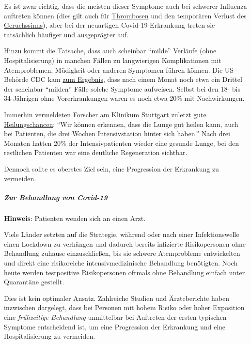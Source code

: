Es ist zwar richtig, dass die meisten dieser Symptome auch bei schwerer
Influenza auftreten können (dies gilt auch für
\href{https://www.sciencedaily.com/releases/2009/10/091014111549.htm}{Thrombosen}
und den temporären Verlust des
\href{https://pubmed.ncbi.nlm.nih.gov/23948436/}{Geruchssinns}), aber
bei der neuartigen Covid-19-Erkrankung treten sie tatsächlich häufiger
und ausgeprägter auf.

Hinzu kommt die Tatsache, dass auch scheinbar ``milde'' Verläufe (ohne
Hospitalisierung) in manchen Fällen zu langwierigen Komplikationen mit
Atemproblemen, Müdigkeit oder anderen Symptomen führen können. Die
US-Behörde CDC kam
\href{https://www.cdc.gov/mmwr/volumes/69/wr/mm6930e1.htm}{zum
Ergebnis}, dass nach einem Monat noch etwa ein Drittel der scheinbar
``milden'' Fälle solche Symptome aufweisen. Selbst bei den 18- bis
34-Jährigen ohne Vorerkrankungen waren es noch etwa 20\% mit
Nachwirkungen.

Immerhin vermeldeten Forscher am Klinikum Stuttgart zuletzt
\href{https://www.tagesschau.de/investigativ/kontraste/coronavirus-langzeitfolgen-101.html}{gute
Heilungschancen}: ``Wir können erkennen, dass die Lunge gut heilen kann,
auch bei Patienten, die drei Wochen Intensivstation hinter sich haben.''
Nach drei Monaten hatten 20\% der Intensivpatienten wieder eine gesunde
Lunge, bei den restlichen Patienten war eine deutliche Regeneration
sichtbar.

Dennoch sollte es oberstes Ziel sein, eine Progression der Erkrankung zu
vermeiden.

\hypertarget{zur-behandlung-von-covid-19}{%
\subparagraph{\texorpdfstring{\textbf{Zur Behandlung von
Covid-19}}{Zur Behandlung von Covid-19}}\label{zur-behandlung-von-covid-19}}

\textbf{Hinweis}: Patienten wenden sich an einen Arzt.

Viele Länder setzten auf die Strategie, während oder nach einer
Infektions­welle einen Lockdown zu verhängen und dadurch bereits
infizierte Risikopersonen ohne Behandlung zuhause einzuschließen, bis
sie schwere Atemprobleme entwickelten und direkt eine risikoreiche
intensivmedizinische Behandlung benötigten. Noch heute werden
testpositive Risikopersonen oftmals ohne Behandlung einfach unter
Quarantäne gestellt.

Dies ist kein optimaler Ansatz. Zahlreiche Studien und Ärzteberichte
haben inzwischen dargelegt, dass bei Personen mit hohem Risiko oder
hoher Exposition eine \emph{frühzeitige Behandlung} unmittelbar bei
Auftreten der ersten typischen Symptome entscheidend ist, um eine
Progression der Erkrankung und eine Hospitalisierung zu vermeiden.


